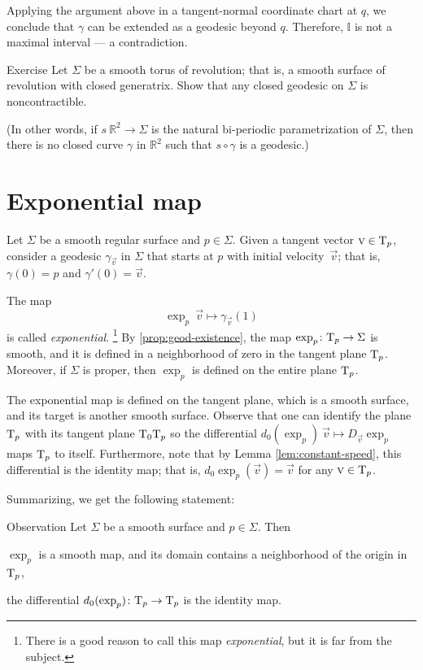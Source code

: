 Applying the argument above in a tangent-normal coordinate chart at $q$, we conclude that $\gamma$ can be extended as a geodesic beyond $q$.
Therefore, $\mathbb{I}$ is not a maximal interval --- a contradiction.
\qeds

\begin{thm}{Exercise}\label{ex:round-torus}
Let $\Sigma$ be a smooth torus of revolution; that is,
a smooth surface of revolution with closed generatrix.
Show that any closed geodesic on $\Sigma$ is noncontractible.

(In other words, if $s\:\mathbb{R}^2\to \Sigma$ is the natural bi-periodic parametrization of $\Sigma$, then
there is no closed curve $\gamma$ in $\mathbb{R}^2$ such that $s\circ\gamma$ is a geodesic.)
\end{thm}


\section{Exponential map}\label{sec:exp}

Let $\Sigma$ be a smooth regular surface and $p\in \Sigma$.
Given a tangent vector ${\text{\sc{v}}}\in \mathrm{T}_p$, consider a geodesic $\gamma_{\vec v}$ in $\Sigma$ that starts at $p$ with initial velocity~$\vec v$; 
that is, $\gamma(0)=p$ and $\gamma'(0)={\vec v}$.

The map 
\[\exp_p\:\vec v\mapsto \gamma_{\vec v}(1)\]
is called \emph{exponential}.%
\footnote{There is a good reason to call this map {}\emph{exponential}, but it is far from the subject.}
By \ref{prop:geod-existence}, the map $\exp_p\colon\mathrm{T}_p\to \Sigma$ is smooth, and it is defined in a neighborhood of zero in the tangent plane $\mathrm{T}_p$.
Moreover, if $\Sigma$ is proper, then $\exp_p$ is defined on the entire plane $\mathrm{T}_p$.

The exponential map
is defined on the tangent plane, which is a smooth surface,
and its target is another smooth surface.
Observe that one can identify the plane $\mathrm{T}_p$
with its tangent plane $\mathrm{T}_0\mathrm{T}_p$ so the differential $d_0(\exp_p)\:\vec v\mapsto D_{\vec v}\exp_p$ maps $\mathrm{T}_p$ to itself.
Furthermore, note that by Lemma \ref{lem:constant-speed}, this differential is the identity map; that is, $d_0\exp_p(\vec v)=
\vec v$ for any $\text{\sc{v}}\in \mathrm{T}_p$.

Summarizing, we get the following statement:

\begin{thm}{Observation}\label{obs:d(exp)=1}
Let $\Sigma$ be a smooth surface and $p\in \Sigma$.
Then 
\begin{subthm}{}
$\exp_p$ is a smooth map, and its domain contains a neighborhood of the origin in $\mathrm{T}_p$, 
\end{subthm}

\begin{subthm}{}
the differential $d_0(\exp_p)\colon\mathrm{T}_p\to \mathrm{T}_p$ is the identity map.
\end{subthm}

\end{thm}

